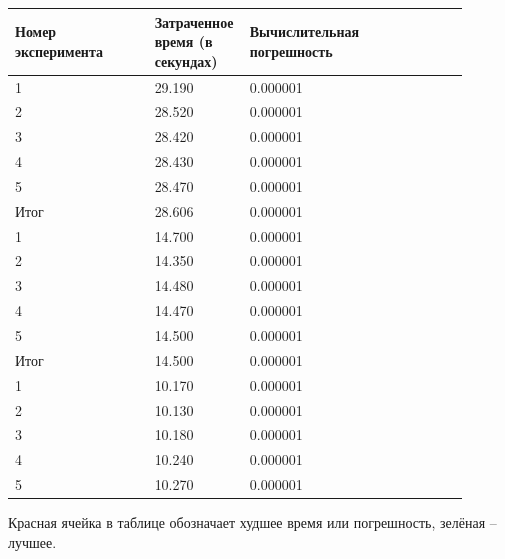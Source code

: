 \documentclass[a4paper, 14pt]{extreport}
\begin{document}
    \begin{center}
    	 \label{t2_1}
    	\begin{tabular}{ | p{0.3\linewidth} | p{0.2\linewidth}  | p{0.2\linewidth} | p{0.2\linewidth} |}
    		\hline
    		Номер эксперимента & Затраченное время (в секундах) & Вычислительная погрешность  \\ \hline
    		1 & 29.190 & 0.000001  \\ \hline
    		2 & 28.520 & 0.000001  \\ \hline
    		3 & 28.420 & 0.000001  \\ \hline
    		4 & 28.430 & 0.000001 \\ \hline
    		5 & 28.470 & 0.000001 \\ \hline
    		Итог & \cellcolor{red!50}28.606 & \cellcolor{green!50}0.000001 \\ \hline
    		1 & 14.700 & 0.000001  \\ \hline
    		2 & 14.350 & 0.000001  \\ \hline
    		3 & 14.480 & 0.000001  \\ \hline
    		4 & 14.470& 0.000001  \\ \hline
    		5 & 14.500 & 0.000001  \\ \hline
    		Итог & 14.500 & \cellcolor{green!50}0.000001 \\ \hline
    		1 & 10.170 & 0.000001  \\ \hline
    		2 & 10.130 & 0.000001  \\ \hline
    		3 & 10.180 & 0.000001  \\ \hline
    		4 & 10.240 & 0.000001  \\ \hline
    		5 & 10.270 & 0.000001  \\ \hline
    	\end{tabular}
     \end{center}
 
	Красная ячейка в таблице обозначает худшее время или погрешность, зелёная – лучшее.

	\begin{center}
		\label{i2_4}
	\end{center}
\end{document}

